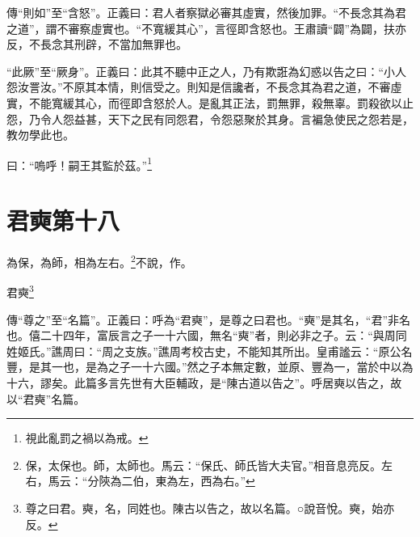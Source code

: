 {\noindent\zhuan{}\fzbyks 傳“則如”至“含怒”。正義曰：君人者察獄必審其虛實，然後加罪。“不長念其為君之道”，謂不審察虛實也。“不寬緩其心”，言徑即含怒也。王肅讀“闢”為闢，扶亦反，不長念其刑辟，不當加無罪也。 \par}

{\noindent\shu{}\fzkt “此厥”至“厥身”。正義曰：此其不聽中正之人，乃有欺誑為幻惑以告之曰：“小人怨汝詈汝。”不原其本情，則信受之。則知是信讒者，不長念其為君之道，不審虛實，不能寬緩其心，而徑即含怒於人。是亂其正法，罰無罪，殺無辜。罰殺欲以止怨，乃令人怨益甚，天下之民有同怨君，令怨惡聚於其身。言褊急使民之怨若是，教勿學此也。 \par}

曰：“嗚呼！嗣王其監於茲。”\footnote{視此亂罰之禍以為戒。}

\section{君奭第十八}


為保，為師，相為左右。\footnote{保，太保也。師，太師也。馬云：“保氏、師氏皆大夫官。”相音息亮反。左右，馬云：“分陝為二伯，東為左，西為右。”}不說，作。

君奭\footnote{尊之曰君。奭，名，同姓也。陳古以告之，故以名篇。○說音悅。奭，始亦反。}


{\noindent\zhuan{}\fzbyks 傳“尊之”至“名篇”。正義曰：呼為“君奭”，是尊之曰君也。“奭”是其名，“君”非名也。僖二十四年，富辰言之子一十六國，無名“奭”者，則必非之子。云：“與周同姓姬氏。”譙周曰：“周之支族。”譙周考校古史，不能知其所出。皇甫謐云：“原公名豐，是其一也，是為之子一十六國。”然之子本無定數，並原、豐為一，當於中以為十六，謬矣。此篇多言先世有大臣輔政，是“陳古道以告之”。呼居奭以告之，故以“君奭”名篇。 \par}

